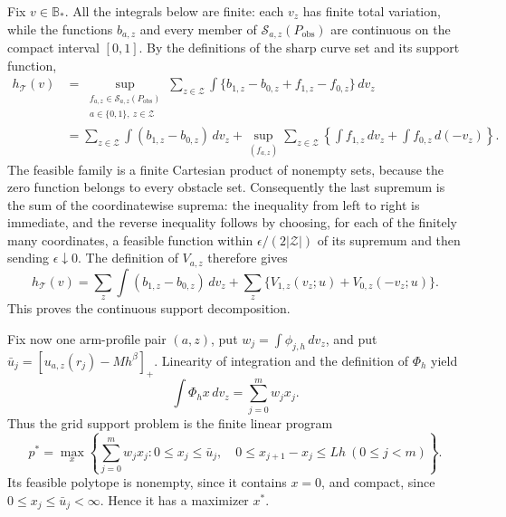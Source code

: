 Fix \(v\in\mathbb B_*\).  All the integrals below are finite: each
\(v_z\) has finite total variation, while the functions \(b_{a,z}\) and
every member of \(\mathcal S_{a,z}(P_{\mathrm{obs}})\) are continuous on
the compact interval \([0,1]\).  By the definitions of the sharp curve
set and its support function,
\[
\begin{aligned}
h_{\mathcal T}(v)
&=\sup_{\substack{f_{a,z}\in\mathcal S_{a,z}(P_{\mathrm{obs}})\\
                   a\in\{0,1\},\ z\in\mathcal Z}}
 \sum_{z\in\mathcal Z}\int
 \{b_{1,z}-b_{0,z}+f_{1,z}-f_{0,z}\}\,dv_z \\
&=\sum_{z\in\mathcal Z}\int(b_{1,z}-b_{0,z})\,dv_z
  +\sup_{(f_{a,z})}\sum_{z\in\mathcal Z}
       \left\{\int f_{1,z}\,dv_z+\int f_{0,z}\,d(-v_z)\right\}.
\end{aligned}
\]
The feasible family is a finite Cartesian product of nonempty sets, because
the zero function belongs to every obstacle set.  Consequently the last
supremum is the sum of the coordinatewise suprema: the inequality from left
to right is immediate, and the reverse inequality follows by choosing, for
each of the finitely many coordinates, a feasible function within
\(\epsilon/(2|\mathcal Z|)\) of its supremum and then sending
\(\epsilon\downarrow0\).  The definition of \(V_{a,z}\) therefore gives
\[
h_{\mathcal T}(v)
=\sum_z\int(b_{1,z}-b_{0,z})\,dv_z
 +\sum_z\{V_{1,z}(v_z;u)+V_{0,z}(-v_z;u)\}.
\]
This proves the continuous support decomposition.

Fix now one arm-profile pair \((a,z)\), put
\(w_j=\int\phi_{j,h}\,dv_z\), and put
\(\bar u_j=[u_{a,z}(r_j)-Mh^\beta]_+\).  Linearity of integration and the
definition of \(\Phi_h\) yield
\[
 \int\Phi_hx\,dv_z=\sum_{j=0}^m w_jx_j.
\]
Thus the grid support problem is the finite linear program
\[
 p^*=\max_x\left\{\sum_{j=0}^m w_jx_j:
 0\le x_j\le\bar u_j,\quad
 0\le x_{j+1}-x_j\le Lh\ (0\le j<m)\right\}.
\]
Its feasible polytope is nonempty, since it contains \(x=0\), and compact,
since \(0\le x_j\le\bar u_j<\infty\).  Hence it has a maximizer \(x^*\).

